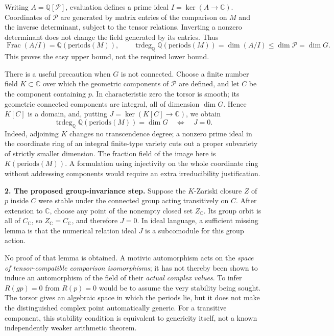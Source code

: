 \documentclass[11pt,a4paper]{article}
\newcommand{\Q}{\mathbb{Q}}
\newcommand{\C}{\mathbb{C}}
\numberwithin{equation}{section}
\begin{document}
Writing $A=\Q[\mathcal P]$, evaluation defines a prime ideal
$I=\ker(A\to\C)$. Coordinates of $\mathcal P$ are generated by matrix
entries of the comparison on $M$ and the inverse determinant, subject to
the tensor relations. Inverting a nonzero determinant does not change the
field generated by its entries. Thus
\[
 \operatorname{Frac}(A/I)=\Q(\mathrm{periods}(M)),\qquad
 \operatorname{trdeg}_{\Q}\Q(\mathrm{periods}(M))
       =\dim(A/I)\le\dim\mathcal P=\dim G.
 \tag{49.1}
\]
This proves the easy upper bound, not the required lower bound.

There is a useful precaution when $G$ is not connected. Choose a finite
number field $K\subset\C$ over which the geometric components of
$\mathcal P$ are defined, and let $C$ be the component containing $p$.
In characteristic zero the torsor is smooth; its geometric connected
components are integral, all of dimension $\dim G$. Hence $K[C]$ is a
domain, and, putting $J=\ker(K[C]\to\C)$, we obtain
\[
 \operatorname{trdeg}_{\Q}\Q(\mathrm{periods}(M))=\dim G
       \quad\Longleftrightarrow\quad J=0.
 \tag{49.2}
\]
Indeed, adjoining $K$ changes no transcendence degree; a nonzero prime
ideal in the coordinate ring of an integral finite-type variety cuts out
a proper subvariety of strictly smaller dimension. The fraction field
of the image here is $K(\mathrm{periods}(M))$. A formulation using
injectivity on the whole coordinate ring without addressing components
would require an extra irreducibility justification.

\textbf{2. The proposed group-invariance step.}
Suppose the $K$-Zariski closure $Z$ of $p$ inside $C$ were stable under the
connected group acting transitively on $C$. After extension to $\C$, choose
any point of the nonempty closed set $Z_{\C}$. Its group orbit is all of
$C_{\C}$, so $Z_{\C}=C_{\C}$, and therefore $J=0$. In ideal language, a
sufficient missing lemma is that the numerical relation ideal $J$ is a
subcomodule for this group action.

No proof of that lemma is obtained. A motivic automorphism acts on the
\emph{space of tensor-compatible comparison isomorphisms}; it has not
thereby been shown to induce an automorphism of the field of their
\emph{actual complex values}. To infer $R(gp)=0$ from $R(p)=0$ would be
to assume the very stability being sought. The torsor gives an algebraic
space in which the periods lie, but it does not make the distinguished
complex point automatically generic. For a transitive component, this
stability condition is equivalent to genericity itself, not a known
independently weaker arithmetic theorem.
\end{document}

